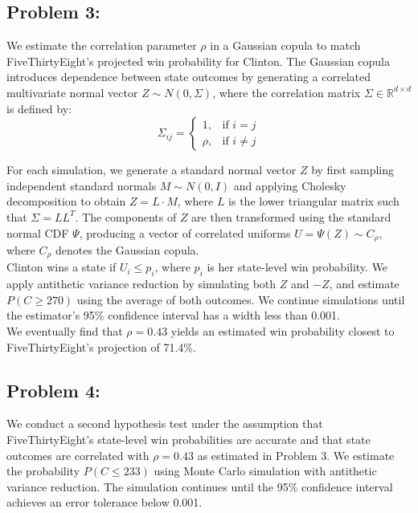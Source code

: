 \documentclass{report}
\begin{document}
\subsection*{Problem 3:}
We estimate the correlation parameter $\rho$ in a Gaussian copula to match FiveThirtyEight's projected win probability for Clinton. The Gaussian copula introduces dependence between state outcomes by generating a correlated multivariate normal vector $Z \sim N(0, \Sigma)$, where the correlation matrix $\Sigma \in \mathbb{R}^{d \times d}$ is defined by:
\[
\Sigma_{ij} =
\begin{cases}
1, & \text{if } i = j \\
\rho, & \text{if } i \ne j
\end{cases}
\]

For each simulation, we generate a standard normal vector $Z$ by first sampling independent standard normals $M \sim N(0, I)$ and applying Cholesky decomposition to obtain $Z = L \cdot M$, where $L$ is the lower triangular matrix such that $\Sigma = LL^T$. The components of $Z$ are then transformed using the standard normal CDF $\Psi$, producing a vector of correlated uniforms $U = \Psi(Z) \sim C_{\rho}$, where $C_{\rho}$ denotes the Gaussian copula. \\

Clinton wins a state if $U_i \leq p_i$, where $p_i$ is her state-level win probability. We apply antithetic variance reduction by simulating both $Z$ and $-Z$, and estimate $P(C \geq 270)$ using the average of both outcomes. We continue simulations until the estimator's 95\% confidence interval has a width less than 0.001. \\

We eventually find that $\rho = 0.43$ yields an estimated win probability closest to FiveThirtyEight's projection of 71.4\%.

\subsection*{Problem 4:}
We conduct a second hypothesis test under the assumption that FiveThirtyEight's state-level win probabilities are accurate and that state outcomes are correlated with $\rho = 0.43$ as estimated in Problem 3. We estimate the probability $P(C \leq 233)$ using Monte Carlo simulation with antithetic variance reduction. The simulation continues until the 95\% confidence interval achieves an error tolerance below 0.001. \\
\end{document}

